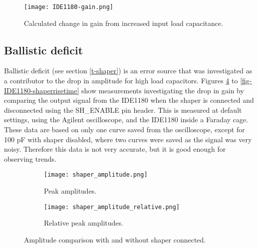 \documentclass[../main/thesis.tex]{subfiles}
\begin{document}
\begin{figure}%
	\centering
	\texttt{[image: IDE1180-gain.png]}
	\caption{Calculated change in gain from increased input load capacitance. \citep{IDE1180email}}
	\label{fig-ide-gain}
\end{figure} 

\newpage
\subsection{Ballistic deficit}
\label{ide-gain-ballistic}

Ballistic deficit (see section \ref{t-shaper}) is an error source that was investigated as a contributor to the drop in amplitude for high load capacitors. Figures \ref{fig-IDE1180-shaperamp} to \ref{fig-IDE1180-shaperrisetime} show measurements investigating the drop in gain by comparing the output signal from the IDE1180 when the shaper is connected and disconnected using the SH\_ENABLE pin header. This is measured at default settings, using the Agilent oscilloscope, and the IDE1180 inside a Faraday cage. These data are based on only one curve saved from the oscilloscope, except  for 100 pF with shaper disabled, where two curves were saved as the signal was very noisy. Therefore this data is not very accurate, but it is good enough for observing trends. 

\begin{figure}[p]
	\centering
	\begin{subfigure}{.5\textwidth}
		\centering
		\texttt{[image: shaper\_amplitude.png]}
		\caption{Peak amplitudes.}
		\label{fig-IDE1180-shaperamp-}
	\end{subfigure}%
	\begin{subfigure}{.5\textwidth}
		\centering
		\texttt{[image: shaper\_amplitude\_relative.png]}
		\caption{Relative peak amplitudes.}
		\label{fig-IDE1180-shaperamp-rel} 
	\end{subfigure}
	\caption{Amplitude comparison with and without shaper connected.}
	\label{fig-IDE1180-shaperamp}
\end{figure}
\end{document}
